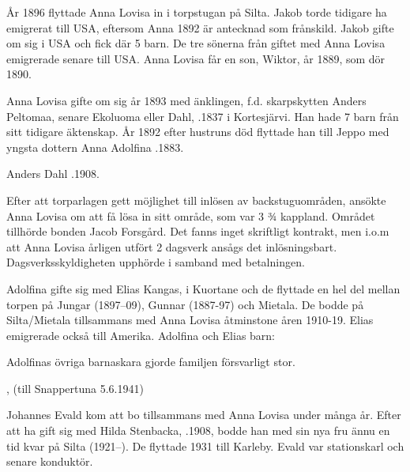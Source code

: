 År 1896 flyttade Anna Lovisa in i torpstugan på Silta. Jakob torde tidigare ha emigrerat till USA, eftersom Anna 1892 		är antecknad som frånskild. Jakob gifte om sig i USA och fick där 5 barn. De tre sönerna från giftet med Anna Lovisa emigrerade senare till USA. Anna Lovisa får en son, Wiktor, år 1889, som dör 1890.

Anna Lovisa gifte om sig år 1893 med änklingen, f.d. skarpskytten Anders Peltomaa, senare Ekoluoma eller Dahl, .1837 i Kortesjärvi. Han hade 7 barn från sitt tidigare äktenskap. År 1892 efter hustruns död flyttade han till Jeppo med yngsta dottern Anna Adolfina .1883.

Anders Dahl .1908.

Efter att torparlagen gett möjlighet till inlösen av backstuguområden, ansökte Anna Lovisa om att få lösa in sitt område, som var 3 ¾ kappland. Området tillhörde bonden Jacob Forsgård. Det fanns inget skriftligt kontrakt, men i.o.m att Anna Lovisa årligen utfört 2 dagsverk ansågs det inlösningsbart. Dagsverksskyldigheten upphörde i samband med betalningen.

Adolfina gifte sig med Elias Kangas,  i Kuortane och de flyttade en hel del mellan torpen på Jungar (1897--09), Gunnar (1887-97) och Mietala. De bodde på Silta/Mietala tillsammans med Anna Lovisa åtminstone åren 1910-19. Elias emigrerade också till Amerika. Adolfina och Elias barn:
\begin{jhchildren}
  \item {}
  \item {}
\end{jhchildren}

Adolfinas övriga barnaskara gjorde familjen försvarligt stor.
\begin{jhchildren}
  \item {}
  \item {}
  \item {}
  \item {}
  \item {}, (till Snappertuna 5.6.1941)
  \item {}
\end{jhchildren}

Johannes Evald kom att bo tillsammans med Anna Lovisa under många år. Efter att ha gift sig med Hilda Stenbacka,  .1908, bodde han med sin nya fru ännu en tid kvar på Silta (1921--). De flyttade 1931 till Karleby. Evald var stationskarl och senare konduktör.

